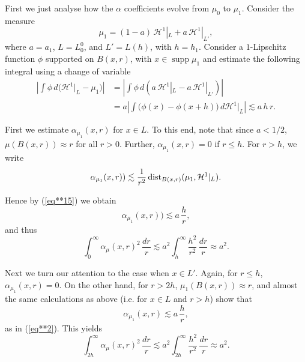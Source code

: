 \documentclass[11pt]{amsart}
\newcommand{\HH}{{\mathcal H}}
\newcommand{\dist}{{\rm dist}}
\newcommand{\rf}[1]{{(\ref{#1})}}
\newcommand{\supp}{\operatorname{supp}}
\theoremstyle{definition}
\theoremstyle{remark}
\numberwithin{equation}{section}
\begin{document}
First we just analyse how the $\alpha$ coefficients evolve from $\mu_0$ to $\mu_1$. Consider the measure 
$$\mu_1= (1-a)\,\HH^1|_L + a\,\HH^1|_{L'},$$
where $a=a_1$, $L=L_0^0$, and $L'=L(h)$, with $h=h_1$.
Consider a $1$-Lipschitz function $\phi$ supported on $B(x,r)$, with $x\in \supp \mu_1$ and estimate the following integral using a change of variable
\begin{align}\label{eq**15}
\left|\int \phi \,d\bigl(\HH^1|_L - \mu_1)\right| & = \left|\int \phi \,d(a\,\HH^1|_{L} - a\,\HH^1|_{L'})
\right|\\
& = a \left|\int \bigl(\phi(x) - \phi(x+h)\bigr) \,d\HH^1|_{L} \right| \lesssim a\,h\,r. \nonumber
\end{align}

First we estimate $\alpha_{\mu_1}(x,r)$ for $x\in L$. To this end, note that since $a<1/2$, $\mu(B(x,r))
\approx r$ for all $r>0$. 
Further, $\alpha_{\mu_1}(x,r)=0$ if $r\leq h$. 
For $r>h$, we write
$$\alpha_{\mu_1}(x,r))\lesssim \frac1{r^2}\,\dist_{B(x,r)}(\mu_1,\HH^1|_L).$$
 
Hence by \rf{eq**15} we obtain
\begin{equation}\label{eq**2}
\alpha_{\mu_1}(x,r))\lesssim a\,\frac hr,
\end{equation}
and thus 
\begin{equation}\label{eq**25}
\int_0^\infty\alpha_\mu(x,r)^2\,\frac{dr}r\lesssim a^2\int_h^\infty\frac{h^2}{r^2}\,\frac{dr}r\approx a^2.
\end{equation}

Next we turn our attention to the case when $x\in L'$. Again, for $r\leq h$, $\alpha_{\mu_1}(x,r)=0$.
On the other hand, for $r>2h$, $\mu_1(B(x,r))\approx r$, and almost the same calculations as 
above (i.e. for $x\in L$ and $r>h$) show 
that
$$\alpha_{\mu_1}(x,r)\lesssim a\,\frac hr,$$
as in \rf{eq**2}. This yields
\begin{equation}\label{eq**3}
\int_{2h}^\infty 
\alpha_\mu(x,r)^2\,\frac{dr}r\lesssim a^2\int_{2h}^\infty\frac{h^2}{r^2}\,\frac{dr}r\approx a^2.
\end{equation}
\end{document}
